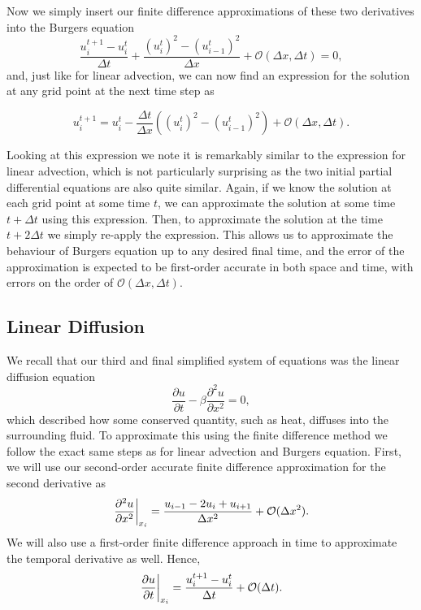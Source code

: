 Now we simply insert our finite difference approximations of these two derivatives into the Burgers equation
\begin{equation}
	\frac{u_i^{t+1} - u_{i}^t}{\Delta t} +  \frac{(u_i^t)^2 - (u_{i-1}^t)^2}{\Delta x} + \mathcal{O}(\Delta x, \Delta t) = 0,
\end{equation}
and, just like for linear advection, we can now find an expression for the solution at any grid point at the next time step as
\begin{eqBox}
\begin{equation}
	u_i^{t+1} = u_{i}^t - \frac{\Delta t}{\Delta x} \left( \left(u_i^t \right)^2 - \left( u_{i-1}^t \right)^2 \right) + \mathcal{O}(\Delta x, \Delta t).
\end{equation}
\end{eqBox}
Looking at this expression we note it is remarkably similar to the expression for linear advection, which is not particularly surprising as the two initial partial differential equations are also quite similar. Again, if we know the solution at each grid point at some time $t$, we can approximate the solution at some time $t+\Delta t$ using this expression. Then, to approximate the solution at the time $t+2\Delta t$ we simply re-apply the expression. This allows us to approximate the behaviour of Burgers equation up to any desired final time, and the error of the approximation is expected to be first-order accurate in both space and time, with errors on the order of $\mathcal{O}(\Delta x, \Delta t)$.

\subsection{Linear Diffusion}
We recall that our third and final simplified system of equations was the linear diffusion equation
\begin{equation}
\frac{\partial u}{\partial t} - \beta \frac{\partial^2 u}{\partial x^2} = 0,
\end{equation}
which described how some conserved quantity, such as heat, diffuses into the surrounding fluid. To approximate this using the finite difference method we follow the exact same steps as for linear advection and Burgers equation. First, we will use our second-order accurate finite difference approximation for the second derivative as
\begin{equation}
	\left.\frac{\partial^2 u}{\partial x^2}\right\rvert_{x_i}^{} = \frac{u_{i-1} - 2u_i + u_{i+1}}{\Delta x^2} + \mathcal{O}(\Delta x^2).
\end{equation}
We will also use a first-order finite difference approach in time to approximate the temporal derivative as well. Hence,
\begin{equation}
	\left.\frac{\partial u}{\partial t}\right\rvert_{x_i}^{} = \frac{u_i^{t+1} - u_{i}^t}{\Delta t} + \mathcal{O}(\Delta t).
\end{equation}

